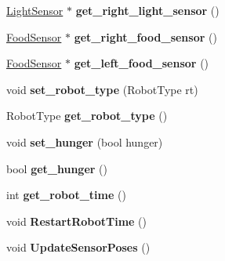 \begin{DoxyCompactItemize}
\item 
\hyperlink{class_light_sensor}{Light\+Sensor} $\ast$ {\bfseries get\+\_\+right\+\_\+light\+\_\+sensor} ()\hypertarget{class_robot_aff66784b080f5d7329a8f45d679d1b60}{}\label{class_robot_aff66784b080f5d7329a8f45d679d1b60}

\item 
\hyperlink{class_food_sensor}{Food\+Sensor} $\ast$ {\bfseries get\+\_\+right\+\_\+food\+\_\+sensor} ()\hypertarget{class_robot_acdf59a9f9124f4d8a910a2fa85e4d7c3}{}\label{class_robot_acdf59a9f9124f4d8a910a2fa85e4d7c3}

\item 
\hyperlink{class_food_sensor}{Food\+Sensor} $\ast$ {\bfseries get\+\_\+left\+\_\+food\+\_\+sensor} ()\hypertarget{class_robot_a6bde50502517a623c309dbfbef546063}{}\label{class_robot_a6bde50502517a623c309dbfbef546063}

\item 
void {\bfseries set\+\_\+robot\+\_\+type} (Robot\+Type rt)\hypertarget{class_robot_ad811b955d24c95ebb16f0a2c185876a9}{}\label{class_robot_ad811b955d24c95ebb16f0a2c185876a9}

\item 
Robot\+Type {\bfseries get\+\_\+robot\+\_\+type} ()\hypertarget{class_robot_a1463b5699ff9a30a76768f7570b43b0d}{}\label{class_robot_a1463b5699ff9a30a76768f7570b43b0d}

\item 
void {\bfseries set\+\_\+hunger} (bool hunger)\hypertarget{class_robot_a3acf3a0f65d23859d7991667b09d28ef}{}\label{class_robot_a3acf3a0f65d23859d7991667b09d28ef}

\item 
bool {\bfseries get\+\_\+hunger} ()\hypertarget{class_robot_aacdc924197b130a93046168cc31933a8}{}\label{class_robot_aacdc924197b130a93046168cc31933a8}

\item 
int {\bfseries get\+\_\+robot\+\_\+time} ()\hypertarget{class_robot_ae8f5051655c730486561e43be5602ca7}{}\label{class_robot_ae8f5051655c730486561e43be5602ca7}

\item 
void {\bfseries Restart\+Robot\+Time} ()\hypertarget{class_robot_a80dc608c5bf63c6d3b814a9f36fde462}{}\label{class_robot_a80dc608c5bf63c6d3b814a9f36fde462}

\item 
void {\bfseries Update\+Sensor\+Poses} ()\hypertarget{class_robot_a1227689786b8842a3cd14204a98c891d}{}\label{class_robot_a1227689786b8842a3cd14204a98c891d}

\end{DoxyCompactItemize}
